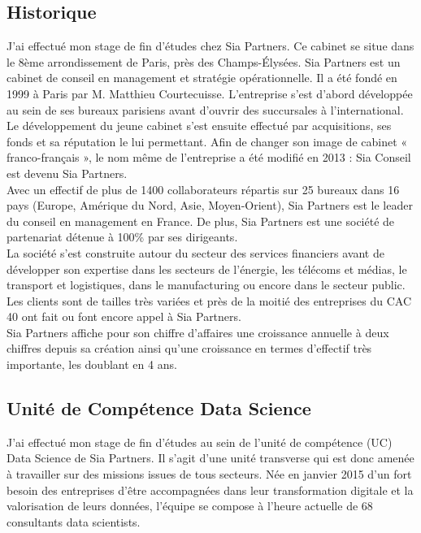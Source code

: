 \documentclass{article} %
\begin{document}
\subsection{Historique}
J’ai effectué mon stage de fin d’études chez Sia Partners. Ce cabinet se situe dans le 8ème arrondissement de Paris, près des Champs-Élysées. Sia Partners est un cabinet de conseil en management et stratégie opérationnelle. Il a été fondé en 1999 à Paris par M. Matthieu Courtecuisse. L’entreprise s’est d’abord développée au sein de ses bureaux parisiens avant d’ouvrir des succursales à l’international. Le développement du jeune cabinet s’est ensuite effectué par acquisitions, ses fonds et sa réputation le lui permettant. Afin de changer son image de cabinet « franco-français », le nom même de l’entreprise a été modifié en 2013 : Sia Conseil est devenu Sia Partners.\\

Avec un effectif de plus de 1400 collaborateurs répartis sur 25 bureaux dans 16 pays (Europe, Amérique du Nord, Asie, Moyen-Orient), Sia Partners est le leader du conseil en management en France. De plus, Sia Partners est une société de partenariat détenue à 100\% par ses dirigeants.\\

La société s’est construite autour du secteur des services financiers avant de développer son expertise dans les secteurs de l’énergie, les télécoms et médias, le transport et logistiques, dans le manufacturing ou encore dans le secteur public. Les clients sont de tailles très variées et près de la moitié des entreprises du CAC 40 ont fait ou font encore appel à Sia Partners.\\

Sia Partners affiche pour son chiffre d’affaires une croissance annuelle à deux chiffres depuis sa création ainsi qu’une croissance en termes d’effectif très importante, les doublant en 4 ans.\\

\subsection{Unité de Compétence Data Science}
J’ai effectué mon stage de fin d’études au sein de l’unité de compétence (UC) Data Science de Sia Partners. Il s’agit d’une unité transverse qui est donc amenée à travailler sur des missions issues de tous secteurs. Née en janvier 2015 d’un fort besoin des entreprises d’être accompagnées dans leur transformation digitale et la valorisation de leurs données, l’équipe se compose à l’heure actuelle de 68 consultants data scientists.\\
\end{document}
